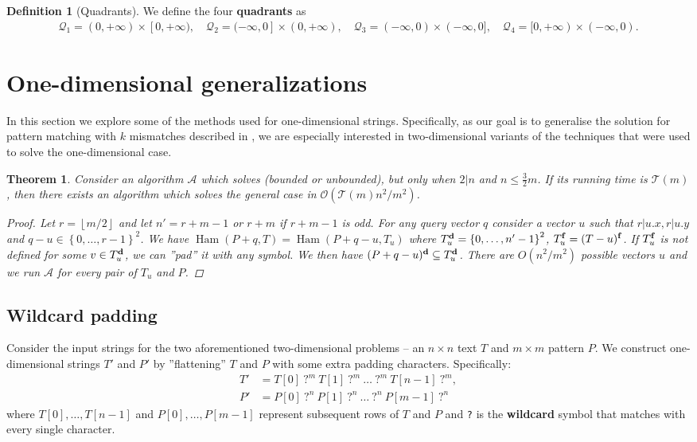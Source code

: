 \documentclass[11pt]{article}
\renewcommand{\O}{\mathcal{O}}
\newcommand{\set}[1]{\left\lbrace #1 \right\rbrace}
\newcommand{\floor}[1]{\left\lfloor #1 \right\rfloor}
\newcommand{\eq}[1]{\begin{align*} #1 \end{align*}}
\DeclareMathOperator*{\Ham}{Ham}
\theoremstyle{plain}
\newtheorem{theorem}{Theorem}
\theoremstyle{definition}
\newtheorem{definition}{Definition}
\begin{document}
\newcommand{\Q}{\mathcal{Q}}
\begin{definition}[Quadrants]
	We define the four \textbf{quadrants} as
	\eq{
		\Q_1 = (0, +\infty) \times [0, +\infty), \quad
		\Q_2 = (-\infty, 0] \times (0, +\infty), \quad
		\Q_3 = (-\infty, 0) \times (-\infty, 0], \quad
		\Q_4 = [0, +\infty) \times (-\infty, 0).
	}
\end{definition}


\section{One-dimensional generalizations}
In this section we explore some of the methods used for one-dimensional strings.
Specifically, as our goal is to generalise the solution for pattern matching with $k$ mismatches described in \cite{Gawrychowski2017}, we are especially interested in two-dimensional variants of the techniques that were used to solve the one-dimensional case.


\begin{theorem}
	Consider an algorithm $\mathcal{A}$ which solves \HD (bounded or unbounded), but only when $2|n$ and $n \le \frac{3}{2}m$.
	If its running time is $\mathcal{T}(m)$, then there exists an algorithm which solves the general case in $\O(\mathcal{T}(m) n^2 / m^2)$.
	\begin{proof}
		Let $r = \floor{m / 2}$ and let $n' = r + m - 1$ or $r + m$ if $r + m - 1$ is odd.
		For any query vector $q$ consider a vector $u$ such that $r|u.x, r|u.y$ and $q - u \in \set{0, \dots, r - 1}^2$.
		We have $\Ham(P + q, T) = \Ham(P + q - u, T_u)$ where $\d{T_u} = \set{0, \dots, n' - 1}^2$, $T_u^\mathbf{f} = (T - u)^\mathbf{f}$.
		If $T_u^\mathbf{f}$ is not defined for some $v \in T_u^\mathbf{d}$, we can ''pad'' it with any symbol.
		We then have $(P + q - u)^\mathbf{d} \subseteq T_u^\mathbf{d}$.
		There are $O(n^2 / m^2)$ possible vectors $u$ and we run $\mathcal{A}$ for every pair of $T_u$ and $P$.
	\end{proof}
\end{theorem}



\subsection{Wildcard padding}
Consider the input strings for the two aforementioned two-dimensional problems -- an $n \times n$ text $T$ and $m \times m$ pattern $P$.
We construct one-dimensional strings $T'$ and $P'$ by ''flattening'' $T$ and $P$ with some extra padding characters.
Specifically:
\eq{
	T' &= T[0] \ \texttt{?}^{m} \ T[1] \ \texttt{?}^{m} \ \dots \ \texttt{?}^{m} \ T[n - 1] \ \texttt{?}^{m}, \\
	P' &= P[0] \ \texttt{?}^{n} \ P[1] \ \texttt{?}^{n} \ \dots \ \texttt{?}^{n} \ P[m - 1] \ \texttt{?}^{n}
}                                                                          
where $T[0], \dots, T[n - 1]$ and $P[0], \dots, P[m - 1]$ represent subsequent rows of $T$ and $P$ and \texttt{?} is the \textbf{wildcard} symbol that matches with every single character.
\end{document}
